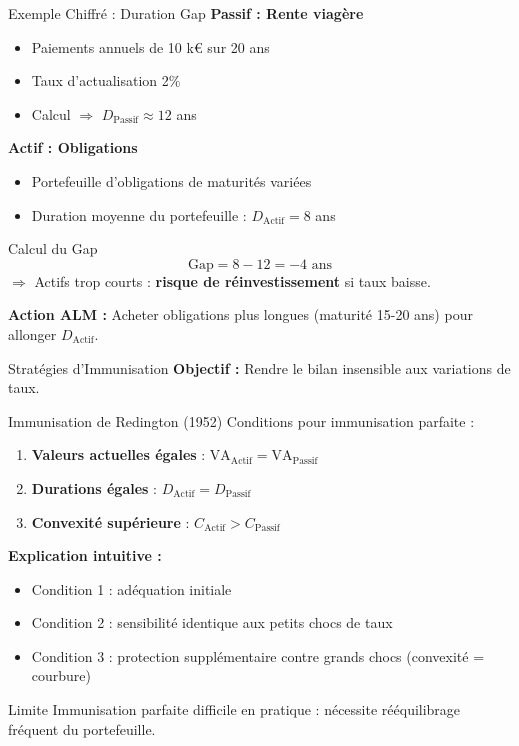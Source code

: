 \documentclass[10pt,aspectratio=169,xcolor={dvipsnames}]{beamer}
\begin{document}
\begin{frame}{Exemple Chiffré : Duration Gap}
\textbf{Passif : Rente viagère}
\begin{itemize}
    \item Paiements annuels de 10 k€ sur 20 ans
    \item Taux d'actualisation 2\%
    \item Calcul $\Rightarrow$ $D_{\text{Passif}} \approx 12$ ans
\end{itemize}

\vspace{0.3cm}
\textbf{Actif : Obligations}
\begin{itemize}
    \item Portefeuille d'obligations de maturités variées
    \item Duration moyenne du portefeuille : $D_{\text{Actif}} = 8$ ans
\end{itemize}

\vspace{0.3cm}
\begin{alertblock}{Calcul du Gap}
\[
\text{Gap} = 8 - 12 = -4 \text{ ans}
\]
$\Rightarrow$ Actifs trop courts : \textbf{risque de réinvestissement} si taux baisse.
\end{alertblock}

\textbf{Action ALM :} Acheter obligations plus longues (maturité 15-20 ans) pour allonger $D_{\text{Actif}}$.
\end{frame}

\begin{frame}{Stratégies d'Immunisation}
\textbf{Objectif : } Rendre le bilan insensible aux variations de taux.
\begin{block}{Immunisation de Redington (1952)}
Conditions pour immunisation parfaite :
\begin{enumerate}
    \item \textbf{Valeurs actuelles égales} : $\text{VA}_{\text{Actif}} = \text{VA}_{\text{Passif}}$
    \item \textbf{Durations égales} : $D_{\text{Actif}} = D_{\text{Passif}}$
    \item \textbf{Convexité supérieure} : $C_{\text{Actif}} > C_{\text{Passif}}$
\end{enumerate}
\end{block}

\vspace{0.3cm}
\textbf{Explication intuitive :}
\begin{itemize}
    \item Condition 1 : adéquation initiale
    \item Condition 2 : sensibilité identique aux petits chocs de taux
    \item Condition 3 : protection supplémentaire contre grands chocs (convexité = courbure)
\end{itemize}

\vspace{0.3cm}
\begin{exampleblock}{Limite}
Immunisation parfaite difficile en pratique : nécessite rééquilibrage fréquent du portefeuille.
\end{exampleblock}
\end{frame}
\end{document}
